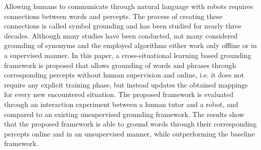 Allowing humans to communicate through natural language with robots requires connections between words and percepts. The process of creating these connections is called symbol grounding and has been studied for nearly three decades. Although many studies have been conducted, not many considered grounding of synonyms and the employed algorithms either work only offline or in a supervised manner. In this paper, a cross-situational learning based grounding framework is proposed that allows grounding of words and phrases through corresponding percepts without human supervision and online, i.e. it does not require any explicit training phase, but instead updates the obtained mappings for every new encountered situation. The proposed framework is evaluated through an interaction experiment between a human tutor and a robot, and compared to an existing unsupervised grounding framework. The results show that the proposed framework is able to ground words through their corresponding percepts online and in an unsupervised manner, while outperforming the baseline framework.
